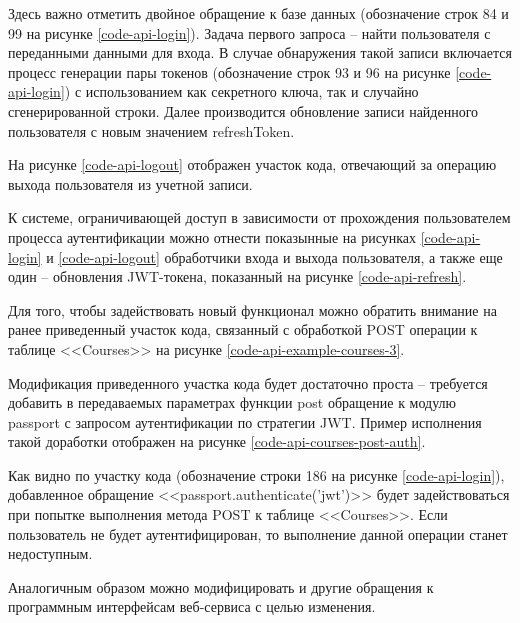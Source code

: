 Здесь важно отметить двойное обращение к базе данных (обозначение строк 84 и 99 на рисунке \ref{code-api-login}).
Задача первого запроса -- найти пользователя с переданными данными для входа.
В случае обнаружения такой записи включается процесс генерации пары токенов (обозначение строк 93 и 96 на рисунке \ref{code-api-login}) с использованием как секретного ключа, так и случайно сгенерированной строки.
Далее производится обновление записи найденного пользователя с новым значением refreshToken.

На рисунке \ref{code-api-logout} отображен участок кода, отвечающий за операцию выхода пользователя из учетной записи.


К системе, ограничивающей доступ в зависимости от прохождения пользователем процесса аутентификации можно отнести показынные на рисунках \ref{code-api-login} и \ref{code-api-logout} обработчики входа и выхода пользователя, а также еще один -- обновления JWT-токена, показанный на рисунке \ref{code-api-refresh}.

Для того, чтобы задействовать новый функционал можно обратить внимание на ранее приведенный участок кода, связанный с обработкой POST операции к таблице <<Courses>> на рисунке \ref{code-api-example-courses-3}.


Модификация приведенного участка кода будет достаточно проста -- требуется добавить в передаваемых параметрах функции post обращение к модулю passport с запросом аутентификации по стратегии JWT.
Пример исполнения такой доработки отображен на рисунке \ref{code-api-courses-post-auth}.


Как видно по участку кода (обозначение строки 186 на рисунке \ref{code-api-login}), добавленное обращение <<passport.authenticate('jwt')>> будет задействоваться при попытке выполнения метода POST к таблице <<Courses>>.
Если пользователь не будет аутентифицирован, то выполнение данной операции станет недоступным.

Аналогичным образом можно модифицировать и другие обращения к программным интерфейсам веб-сервиса с целью изменения.


